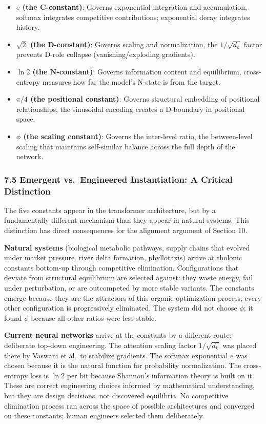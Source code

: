 \documentclass[
  11pt,
  letterpaper,
]{article}
\providecommand{\tightlist}{%
  \setlength{\itemsep}{0pt}\setlength{\parskip}{0pt}}
\begin{document}
\begin{itemize}
\tightlist
\item
  \textbf{\(e\) (the C-constant)}: Governs exponential integration and
  accumulation, softmax integrates competitive contributions;
  exponential decay integrates history.
\item
  \textbf{\(\sqrt{2}\) (the D-constant)}: Governs scaling and
  normalization, the \(1/\sqrt{d_k}\) factor prevents D-role collapse
  (vanishing/exploding gradients).
\item
  \textbf{\(\ln 2\) (the N-constant)}: Governs information content and
  equilibrium, cross-entropy measures how far the model's N-state is
  from the target.
\item
  \textbf{\(\pi/4\) (the positional constant)}: Governs structural
  embedding of positional relationships, the sinusoidal encoding creates
  a D-boundary in positional space.
\item
  \textbf{\(\phi\) (the scaling constant)}: Governs the inter-level
  ratio, the between-level scaling that maintains self-similar balance
  across the full depth of the network.
\end{itemize}

\subsubsection{7.5 Emergent vs.~Engineered Instantiation: A Critical
Distinction}\label{emergent-vs.-engineered-instantiation-a-critical-distinction}

The five constants appear in the transformer architecture, but by a
fundamentally different mechanism than they appear in natural systems.
This distinction has direct consequences for the alignment argument of
Section 10.

\textbf{Natural systems} (biological metabolic pathways, supply chains
that evolved under market pressure, river delta formation, phyllotaxis)
arrive at tholonic constants bottom-up through competitive elimination.
Configurations that deviate from structural equilibrium are selected
against: they waste energy, fail under perturbation, or are outcompeted
by more stable variants. The constants emerge because they are the
attractors of this organic optimization process; every other
configuration is progressively eliminated. The system did not choose
\(\phi\); it found \(\phi\) because all other ratios were less stable.

\textbf{Current neural networks} arrive at the constants by a different
route: deliberate top-down engineering. The attention scaling factor
\(1/\sqrt{d_k}\) was placed there by Vaswani et al.~to stabilize
gradients. The softmax exponential \(e\) was chosen because it is the
natural function for probability normalization. The cross-entropy loss
is \(\ln 2\) per bit because Shannon's information theory is built on
it. These are correct engineering choices informed by mathematical
understanding, but they are design decisions, not discovered equilibria.
No competitive elimination process ran across the space of possible
architectures and converged on these constants; human engineers selected
them deliberately.
\end{document}
